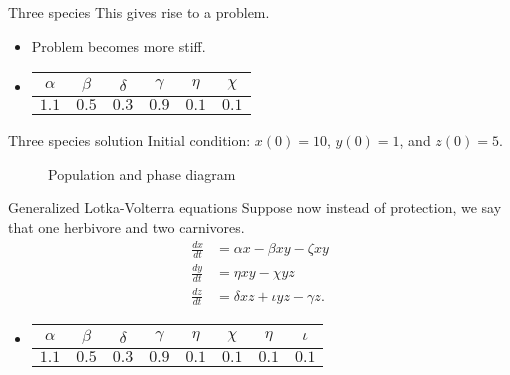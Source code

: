 \documentclass{beamer}
\begin{document}
\begin{frame}{Three species}
	This gives rise to a problem.
	\begin{itemize}
		\item<2-> Problem becomes more stiff.
		\item<3->\begin{table}
		    \centering
		    \begin{tabular}{|c|c|c|c|c|c|}\hline
		    $\alpha$ & $\beta$ & $\delta$ & $\gamma$ & $\eta$ & $\chi$\\\hline
		    $1.1$ & $0.5$ & $0.3$ & $0.9$ & $0.1$ & $0.1$\\\hline
		    \end{tabular}
		\end{table}
	\end{itemize}
\end{frame}

\begin{frame}{Three species solution}
	Initial condition: $x(0) = 10$, $y(0) = 1$, and $z(0) = 5$.
	\begin{figure}
		\centering

		\qquad
	
		\caption{Population and phase diagram}
		\label{fig:3 species}
	\end{figure}
\end{frame}

\begin{frame}{Generalized Lotka-Volterra equations}
	Suppose now instead of protection, we say that one herbivore and two carnivores.
	\begin{align}
	    \frac{dx}{dt} &= \alpha x - \beta xy \nonumber - \zeta xy\\
	    \frac{dy}{dt} &= \eta x y - \chi y z \nonumber\\
	    \frac{dz}{dt} &= \delta xz + \iota yz - \gamma z.\label{eq: mod-eq2}
	\end{align}
	\begin{itemize}
		\item<2-> \begin{table}[H]
    \centering
    \begin{tabular}{|c|c|c|c|c|c|c|c|}\hline
			    $\alpha$ & $\beta$ & $\delta$ & $\gamma$ & $\eta$ & $\chi$ & $\eta$ & $\iota$ \\\hline
			    $1.1$ & $0.5$ & $0.3$ & $0.9$ & $0.1$ & $0.1$ & $0.1$ & $0.1$\\\hline
		    \end{tabular}
		\end{table}
	\end{itemize}
	
\end{frame}
\end{document}
